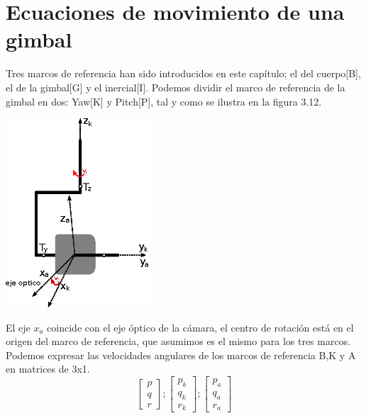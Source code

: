 
\section{Ecuaciones de movimiento de una gimbal}
Tres marcos de referencia han sido introducidos en este capítulo; el del cuerpo[B], el de la gimbal[G] y el inercial[I]. Podemos
dividir el marco de referencia de la gimbal en dos: Yaw[K] y Pitch[P], tal y como se ilustra en la figura 3.12.
\begin{center}
	\includegraphics[width=0.4\textwidth]{Contenido/Cuerpo/Capitulo3/Fig20.eps}
	\label{fig:ModeloMat:Fig1}
\end{center}
El eje $x_a$ coincide con el eje óptico de la cámara, el centro de rotación está en el origen del marco de referencia, que asumimos es el mismo para los tres marcos.\\
Podemos expresar las velocidades angulares de los marcos de referencia B,K y A en matrices de 3x1.
\begin{equation}
	\begin{bmatrix}
		p \\
		q \\
		r
	\end{bmatrix};
	\begin{bmatrix}
		p_k \\
		q_k \\
		r_k
	\end{bmatrix};
	\begin{bmatrix}
		p_a \\
		q_a \\
		r_a
	\end{bmatrix}
\end{equation}
